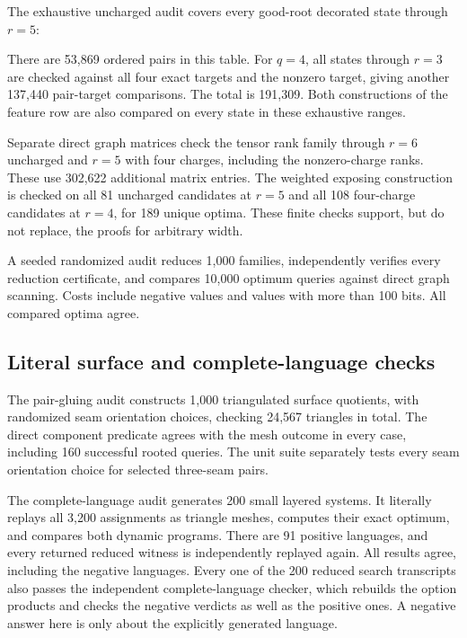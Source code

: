 \documentclass[11pt,letterpaper]{article}
\theoremstyle{definition}
\begin{document}
The exhaustive uncharged audit covers every good-root decorated state through $r=5$:
\begin{table}[ht]
\centering
\caption{Executed uncharged audit. The rank is calculated from the feature rows and the graph predicate is checked for every ordered pair.}\label{tab:algebra}
\end{table}
There are 53,869 ordered pairs in this table. For $q=4$, all states through $r=3$ are checked against all four exact targets and the nonzero target, giving another 137,440 pair-target comparisons. The total is 191,309. Both constructions of the feature row are also compared on every state in these exhaustive ranges.

Separate direct graph matrices check the tensor rank family through $r=6$ uncharged and $r=5$ with four charges, including the nonzero-charge ranks. These use 302,622 additional matrix entries. The weighted exposing construction is checked on all 81 uncharged candidates at $r=5$ and all 108 four-charge candidates at $r=4$, for 189 unique optima. These finite checks support, but do not replace, the proofs for arbitrary width.

A seeded randomized audit reduces 1,000 families, independently verifies every reduction certificate, and compares 10,000 optimum queries against direct graph scanning. Costs include negative values and values with more than 100 bits. All compared optima agree.

\subsection{Literal surface and complete-language checks}
The pair-gluing audit constructs 1,000 triangulated surface quotients, with randomized seam orientation choices, checking 24,567 triangles in total. The direct component predicate agrees with the mesh outcome in every case, including 160 successful rooted queries. The unit suite separately tests every seam orientation choice for selected three-seam pairs.

The complete-language audit generates 200 small layered systems. It literally replays all 3,200 assignments as triangle meshes, computes their exact optimum, and compares both dynamic programs. There are 91 positive languages, and every returned reduced witness is independently replayed again. All results agree, including the negative languages. Every one of the 200 reduced search transcripts also passes the independent complete-language checker, which rebuilds the option products and checks the negative verdicts as well as the positive ones. A negative answer here is only about the explicitly generated language.
\end{document}
